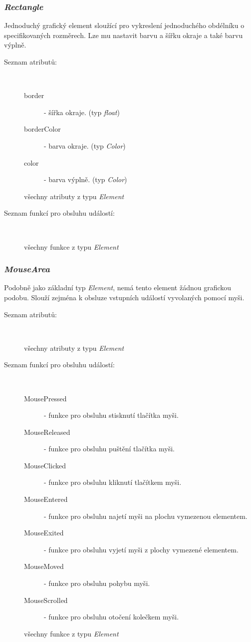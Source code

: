 \documentclass{article}
\begin{document}
\subsubsection{\textit{Rectangle}}
Jednoduchý grafický element sloužící pro vykreslení jednoduchého obdélníku o specifikovaných rozměrech. Lze mu nastavit barvu a šířku okraje a také barvu výplně.\\
\begin{description}
\item[Seznam atributů:] ~
\begin{description}
\item[border] - šířka okraje. (typ \textit{float})
\item[borderColor] - barva okraje. (typ \textit{Color})
\item[color] - barva výplně. (typ \textit{Color})
\item[všechny atributy z typu \textit{Element}]
\end{description}
\item[Seznam funkcí pro obsluhu událostí:] ~
\begin{description}
\item[všechny funkce z typu \textit{Element}]
\end{description}
\end{description}

\subsubsection{\textit{MouseArea}}
Podobně jako základní typ \textit{Element}, nemá tento element žádnou grafickou podobu. Slouží zejména k obsluze vstupních událostí vyvolaných pomocí myši.\\
\begin{description}
\item[Seznam atributů:] ~
\begin{description}
\item[všechny atributy z typu \textit{Element}]
\end{description}
\item[Seznam funkcí pro obsluhu událostí:] ~
\begin{description}
\item[MousePressed] - funkce pro obsluhu stisknutí tlačítka myši.
\item[MouseReleased] - funkce pro obsluhu puštění tlačítka myši.
\item[MouseClicked] - funkce pro obsluhu kliknutí tlačítkem myši.
\item[MouseEntered] - funkce pro obsluhu najetí myši na plochu vymezenou elementem.
\item[MouseExited] - funkce pro obsluhu vyjetí myši z plochy vymezené elementem.
\item[MouseMoved] - funkce pro obsluhu pohybu myši.
\item[MouseScrolled] - funkce pro obsluhu otočení kolečkem myši.
\item[všechny funkce z typu \textit{Element}]
\end{description}
\end{description}
\end{document}
